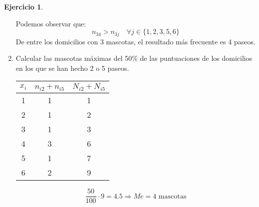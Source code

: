 \documentclass[a4paper, 12pt]{article}
\theoremstyle{definition}
\newtheorem{ej}{Ejercicio}
\begin{document}
\begin{ej}
\begin{enumerate}[label=\alph*)]
	Podemos observar que:
\[
	n_{34} > n_{3j} \quad \forall j \in \{1,2,3,5,6\}
\]
De entre los domicilios con 3 mascotas, el resultado más frecuente es 4 paseos.

	\item Calcular las mascotas máximas del 50\% de las puntuaciones de los domicilios en los que se han hecho 2 o 5 paseos.
	
\begin{center}
\begin{tabular}{|c|c|c|}
	\hline
	\(x_i\) & \(n_{i2} + n_{i5}\) & \(N_{i2} + N_{i5}\) \\
	\hline
	1 & 1 & 1 \\
	2 & 1 & 2 \\
	3 & 1 & 3 \\
	4 & 3 & 6 \\
	5 & 1 & 7 \\
	6 & 2 & 9 \\
	\hline
\end{tabular}
\end{center}

\[
	\frac{50}{100} \cdot 9 = 4.5 \Rightarrow Me = 4 \text{ mascotas}
\]
\end{enumerate}
\end{ej}
\end{document}
